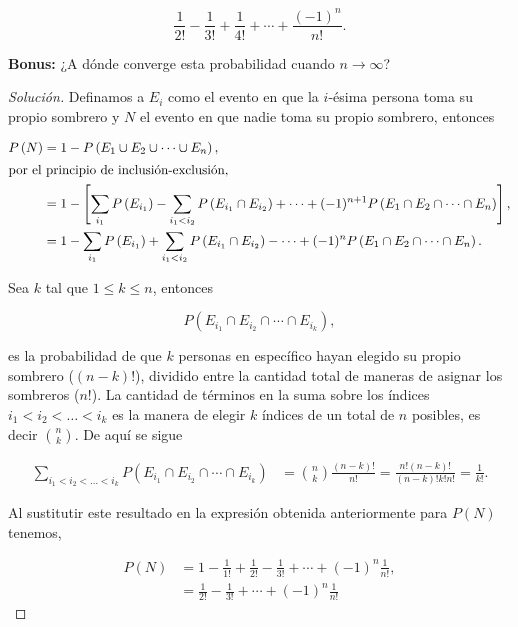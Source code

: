 \documentclass{article}
\renewcommand{\P}[1]{P\left(#1\right)}
\begin{document}
\begin{enumerate}
    \[ \frac{1}{2!} - \frac{1}{3!} + \frac1{4!} + \cdots + \frac{(-1)^n}{n!}. \]

    \textbf{Bonus:} ¿A dónde converge esta probabilidad cuando $n\to\infty$?

    \begin{proof}[Solución]
        Definamos a $E_i$ como el evento en que la $i$-ésima persona toma su propio sombrero y $N$ el evento en que nadie toma su propio sombrero, entonces

        \begin{align*}
            \P{N} &= 1 - \P{E_1 \cup E_2 \cup \cdots \cup E_n},\\
            \intertext{por el principio de inclusión-exclusión,}
            &= 1 - \left[ \sum_{i_1} \P{E_{i_1}} - \sum_{i_1 < i_2} \P{E_{i_1}\cap E_{i_2}} + \cdots + (-1)^{n+1}\P{E_1\cap E_2 \cap \cdots \cap E_n} \right],\\
            &= 1 - \sum_{i_1} \P{E_{i_1}} + \sum_{i_1 < i_2} \P{E_{i_1}\cap E_{i_2}} - \cdots + (-1)^{n}\P{E_1\cap E_2 \cap \cdots \cap E_n}.
        \end{align*}

        Sea $k$ tal que $1 \le k \le n$, entonces 

        \[\P{E_{i_1}\cap E_{i_2} \cap \cdots \cap E_{i_k}},\]

        es la probabilidad de que $k$ personas en específico hayan elegido su propio sombrero  ($(n-k)!$), dividido entre la cantidad total de maneras de asignar los sombreros ($n!$). La cantidad de términos en la suma sobre los índices $i_1 < i_2 < \dots < i_k$ es la manera de elegir $k$ índices de un total de $n$ posibles, es decir $\binom nk$. De aquí se sigue

        \begin{align*}
            \sum_{i_1 < i_2 < \dots < i_k} \P{E_{i_1}\cap E_{i_2} \cap \cdots \cap E_{i_k}} &= \binom nk \frac{(n-k)!}{n!} = \frac{n!(n-k)!}{(n-k)!k!n!} = \frac{1}{k!}.
        \end{align*}

        Al sustitutir este resultado en la expresión obtenida anteriormente para $\P{N}$ tenemos,

        \begin{align*}
            \P{N} &= 1 - \frac{1}{1!} + \frac{1}{2!} - \frac1{3!} + \cdots + (-1)^n \frac{1}{n!},\\
            &= \frac{1}{2!} - \frac1{3!} + \cdots + (-1)^n \frac{1}{n!}
        \end{align*}


\end{proof}
\end{enumerate}
\end{document}
